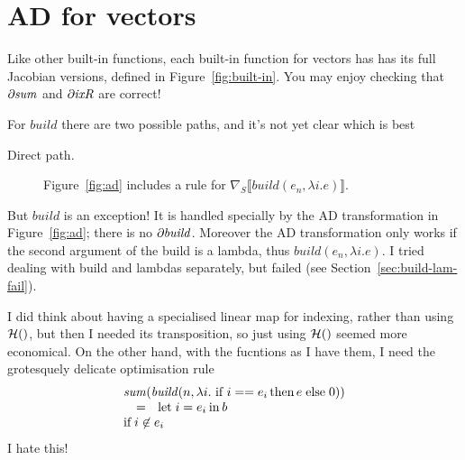\documentclass[sigplan,review]{acmart}
\newcommand{\deriv}{\partial}  %
\newcommand{\grad}[1]{\nabla_S\lb #1 \rb}  %
\newcommand{\gradf}[1]{\deriv\hspace{-0.15mm} #1}  %
\newcommand{\lb}{\llbracket}
\newcommand{\rb}{\rrbracket}
\newcommand{\buildfun}{\mathit{build}}
\newcommand{\sumfunname}{\mathit{sum}}   %
\newcommand{\sumfun}[1]{\sumfunname(#1)}   %
\newcommand{\indexfunname}{\mathit{ixR}} %
\newcommand{\lmhcatv}[1]{{\mathcal H}(#1)}         %
\newcommand{\tom}[1]{}
\begin{document}
\tom{Now some time has passed I think I can justify why the difference
  between forward and reverse modes cannot simply be the order of
  association.  In the case of only two functions, say $f$ and $g$,
  there is no difference between the ``left'' and ``right''
  associations their composition: they are both just \(f \circ g\).
  Yet we do expect there to be a difference between the forward and
  reverse mode \emph{derivatives} of the composition.  Therefore there
  must be more to it than the order of composition.}

\section{AD for vectors} \label{sec:ad-vectors}

Like other built-in functions, each built-in function for vectors
has has its full Jacobian versions, defined in Figure~\ref{fig:built-in}.
You may enjoy checking that $\gradf{\sumfunname}$ and
$\gradf{\indexfunname}$ are correct!

For $\buildfun$ there are two possible paths, and it's not yet clear
which is best
\begin{description}
\item[Direct path.]  Figure~\ref{fig:ad} includes a rule
  for $\grad{\buildfun(e_n, \lambda i.e)}$.
\end{description}
But $\buildfun$ is an exception!  It is handled specially
by the AD transformation in Figure~\ref{fig:ad}; there is no $\gradf{\buildfun}$.
Moreover the AD transformation only works if the second argument of the build is
a lambda, thus $\buildfun(e_n, \lambda i.e)$.  I tried dealing with build and
lambdas separately, but failed (see Section~\ref{sec:build-lam-fail}).

I did think about having a specialised linear map for indexing, rather
than using $\lmhcatv$, but then I needed its transposition, so just
using $\lmhcatv$ seemed more economical.  On the other hand, with the
fucntions as I have them, I need the grotesquely delicate optimisation
rule
$$
\begin{array}{l}
\sumfun{\buildfun( n, \lambda i.\, \mbox{\lstinline|if|} \, i == e_i \,
     \mbox{\lstinline|then|} \, e \,
     \mbox{\lstinline|else|} \, 0 )} \\
\quad = \;\; \mbox{\lstinline|let|}\, i = e_i \, \mbox{\lstinline|in|}\, b \\
\mbox{if} \; i \not\in e_i
\end{array}
$$
I hate this!
\end{document}
